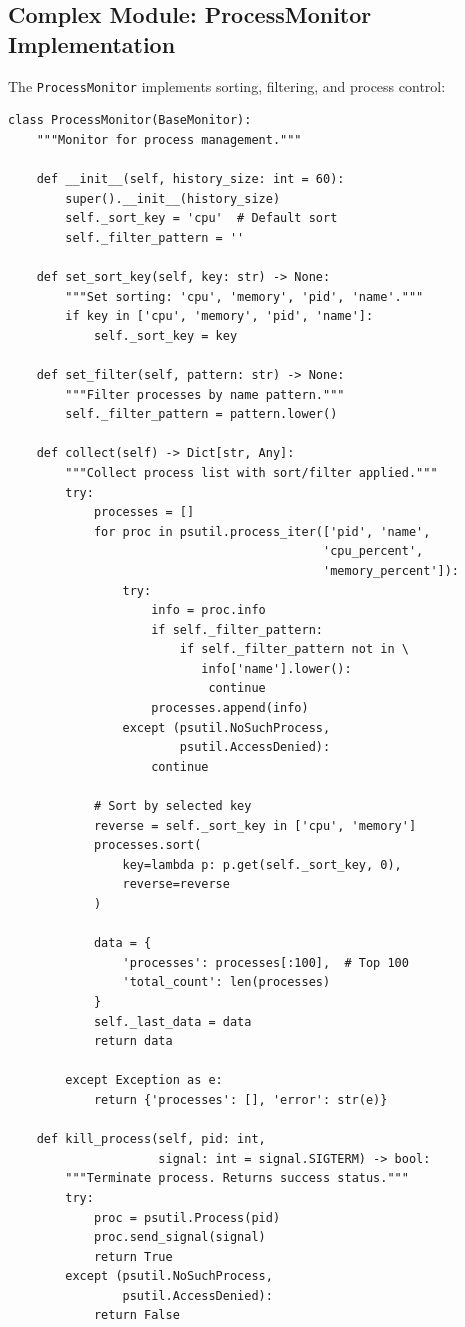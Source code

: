 \documentclass[12pt,a4paper,oneside]{report}
\begin{document}
\subsection{Complex Module: ProcessMonitor Implementation}

The \texttt{ProcessMonitor} implements sorting, filtering, and process control:

\begin{lstlisting}
class ProcessMonitor(BaseMonitor):
    """Monitor for process management."""
    
    def __init__(self, history_size: int = 60):
        super().__init__(history_size)
        self._sort_key = 'cpu'  # Default sort
        self._filter_pattern = ''
        
    def set_sort_key(self, key: str) -> None:
        """Set sorting: 'cpu', 'memory', 'pid', 'name'."""
        if key in ['cpu', 'memory', 'pid', 'name']:
            self._sort_key = key
    
    def set_filter(self, pattern: str) -> None:
        """Filter processes by name pattern."""
        self._filter_pattern = pattern.lower()
    
    def collect(self) -> Dict[str, Any]:
        """Collect process list with sort/filter applied."""
        try:
            processes = []
            for proc in psutil.process_iter(['pid', 'name', 
                                            'cpu_percent', 
                                            'memory_percent']):
                try:
                    info = proc.info
                    if self._filter_pattern:
                        if self._filter_pattern not in \
                           info['name'].lower():
                            continue
                    processes.append(info)
                except (psutil.NoSuchProcess, 
                        psutil.AccessDenied):
                    continue
            
            # Sort by selected key
            reverse = self._sort_key in ['cpu', 'memory']
            processes.sort(
                key=lambda p: p.get(self._sort_key, 0),
                reverse=reverse
            )
            
            data = {
                'processes': processes[:100],  # Top 100
                'total_count': len(processes)
            }
            self._last_data = data
            return data
            
        except Exception as e:
            return {'processes': [], 'error': str(e)}
    
    def kill_process(self, pid: int, 
                     signal: int = signal.SIGTERM) -> bool:
        """Terminate process. Returns success status."""
        try:
            proc = psutil.Process(pid)
            proc.send_signal(signal)
            return True
        except (psutil.NoSuchProcess, 
                psutil.AccessDenied):
            return False
\end{lstlisting}
\end{document}
